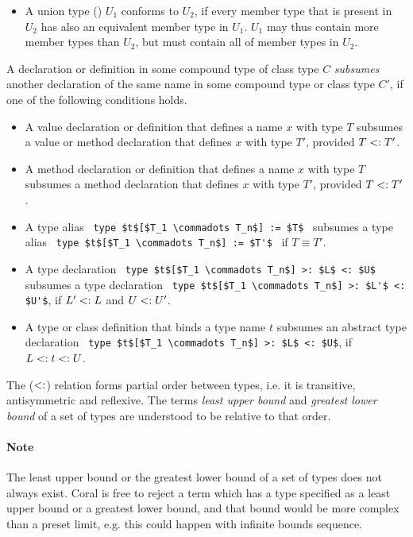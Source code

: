 \begin{itemize}
\item 
A union type () $U_1$ conforms to $U_2$, if every member type that is present in $U_2$ has also an equivalent member type in $U_1$. $U_1$ may thus contain more member types than $U_2$, but must contain all of member types in $U_2$. 
\end{itemize}

A declaration or definition in some compound type of class type $C$ {\em subsumes} another declaration of the same name in some compound type or class type $C'$, if one of the following conditions holds. 
\begin{itemize}
\item A value declaration or definition that defines a name $x$ with type $T$ subsumes a value or method declaration that defines $x$ with type $T'$, provided $T <: T'$. 
\item A method declaration or definition that defines a name $x$ with type $T$ subsumes a method declaration that defines $x$ with type $T'$, provided $T <: T'$. 
\item A type alias ~\lstinline!type $t$[$T_1 \commadots T_n$] := $T$!~ subsumes a type alias ~\lstinline!type $t$[$T_1 \commadots T_n$] := $T'$!~ if $T \equiv T'$. 
\item A type declaration ~\lstinline!type $t$[$T_1 \commadots T_n$] >: $L$ <: $U$!~ subsumes a type declaration ~\lstinline!type $t$[$T_1 \commadots T_n$] >: $L'$ <: $U'$!, if $L' <: L$ and $U <: U'$. 
\item A type or class definition that binds a type name $t$ subsumes an abstract type declaration ~\lstinline!type $t$[$T_1 \commadots T_n$] >: $L$ <: $U$!, if $L <: t <: U$. 
\end{itemize}

The ($<:$) relation forms partial order between types, i.e. it is transitive, antisymmetric and reflexive. The terms {\em least upper bound} and {\em greatest lower bound} of a set of types are understood to be relative to that order. 

\paragraph{Note}
The least upper bound or the greatest lower bound of a set of types does not always exist. Coral is free to reject a term which has a type specified as a least upper bound or a greatest lower bound, and that bound would be more complex than a preset limit, e.g. this could happen with infinite bounds sequence. 


